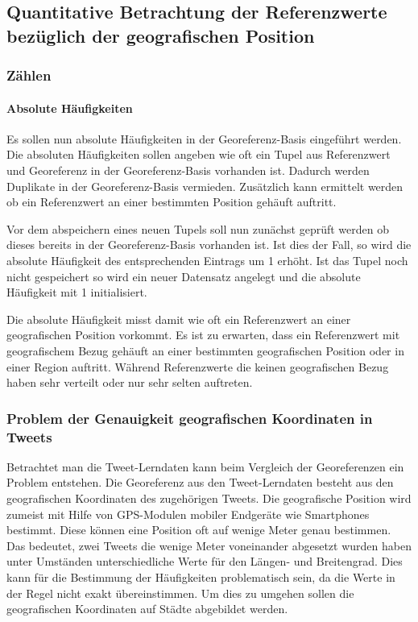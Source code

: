 		\subsection{Quantitative Betrachtung der Referenzwerte bezüglich der geografischen Position}

			\subsubsection{Zählen}

				\paragraph{Absolute Häufigkeiten}

					Es sollen nun absolute Häufigkeiten in der Georeferenz-Basis eingeführt werden.
					Die absoluten Häufigkeiten sollen angeben wie oft ein Tupel aus Referenzwert und Georeferenz in der Georeferenz-Basis vorhanden ist.
					Dadurch werden Duplikate in der Georeferenz-Basis vermieden.
					Zusätzlich kann ermittelt werden ob ein Referenzwert an einer bestimmten Position gehäuft auftritt.

					Vor dem abspeichern eines neuen Tupels soll nun zunächst geprüft werden ob dieses bereits in der Georeferenz-Basis vorhanden ist. 
					Ist dies der Fall, so wird die absolute Häufigkeit des entsprechenden Eintrags um 1 erhöht.
					Ist das Tupel noch nicht gespeichert so wird ein neuer Datensatz angelegt und die absolute Häufigkeit mit 1 initialisiert.

					Die absolute Häufigkeit misst damit wie oft ein Referenzwert an einer geografischen Position vorkommt.
					Es ist zu erwarten, dass ein Referenzwert mit geografischem Bezug gehäuft an einer bestimmten geografischen Position oder in einer Region auftritt.
					Während Referenzwerte die keinen geografischen Bezug haben sehr verteilt oder nur sehr selten auftreten. 

			\subsubsection{Problem der Genauigkeit geografischen Koordinaten in Tweets}  

				Betrachtet man die Tweet-Lerndaten kann beim Vergleich der Georeferenzen ein Problem entstehen.
				Die Georeferenz aus den Tweet-Lerndaten besteht aus den geografischen Koordinaten des zugehörigen Tweets.
				Die geografische Position wird zumeist mit Hilfe von GPS-Modulen mobiler Endgeräte wie Smartphones bestimmt. 
				Diese können eine Position oft auf wenige Meter genau bestimmen.
				Das bedeutet, zwei Tweets die wenige Meter voneinander abgesetzt wurden haben unter Umständen unterschiedliche Werte für den Längen- und Breitengrad.
				Dies kann für die Bestimmung der Häufigkeiten problematisch sein, da die Werte in der Regel nicht exakt übereinstimmen.
				Um dies zu umgehen sollen die geografischen Koordinaten auf Städte abgebildet werden.


